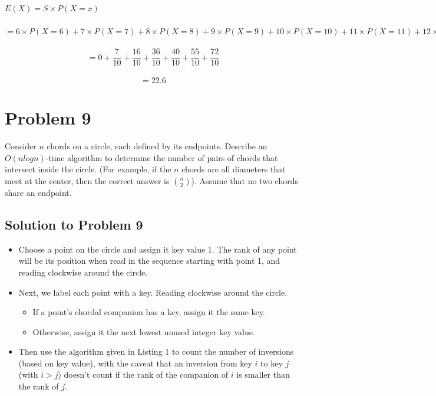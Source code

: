 \documentclass{article}
\begin{document}
$ E(X) = S \times P(X = x) $ \\ \\
$ = 6 \times P(X=6) + 7 \times P(X=7) + 8 \times P(X=8) + 9 \times P(X=9) + 10 \times P(X=10) + 11 \times P(X=11) + 12 \times P(X=12)$ \\ \\
$$= 0 + \frac{7}{10} + \frac{16}{10} + \frac{36}{10} + \frac{40}{10} + \frac{55}{10} + \frac{72}{10}$$ \\
$$=22.6$$

\section{Problem 9}
Consider $n$ chords on a circle, each defined by its endpoints. Describe an $O(nlogn)$-time algorithm to determine the number of pairs of chords that intersect inside the circle. (For example, if the $n$ chords are all diameters that meet at the center, then the correct answer is $\binom n2$). Assume that no two chords share an endpoint.

\subsection{Solution to Problem 9}

\begin{itemize}
	\item Choose a point on the circle and assign it key value 1. The rank of any point will be its position when read in the sequence starting with point 1, and reading clockwise around the circle.
	\item  Next, we label each point with a key. Reading clockwise around the circle.
	\begin{itemize}
		\item If a point’s chordal companion has a key, assign it
		the same key.
		\item Otherwise, assign it the next lowest unused integer key value. 
	\end{itemize} 
	\item Then use the algorithm given in Listing 1 to count the
	number of inversions (based on key value), with the caveat that an inversion from key $i$ to key $j$ (with $i > j$) doesn’t count if the rank of the companion of $i$ is smaller than the rank of $j$.
\end{itemize}

  
\end{document}
